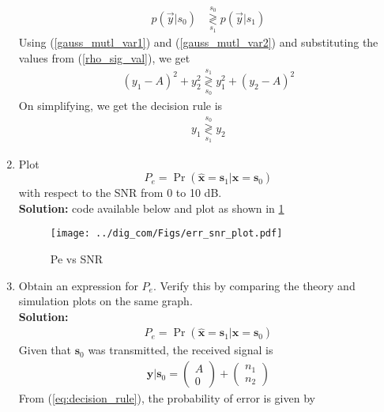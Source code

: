 \documentclass{article}
\numberwithin{equation}{subsection}
\numberwithin{figure}{subsection}
\providecommand{\mbf}{\mathbf}
\providecommand{\brak}[1]{\ensuremath{\left(#1\right)}}
\providecommand{\pr}[1]{\ensuremath{\Pr\left(#1\right)}}
\providecommand{\dec}[2]{\ensuremath{\overset{#1}{\underset{#2}{\gtrless}}}}
\newcommand{\solution}{\noindent \textbf{Solution: }}
\renewcommand\thesection{\arabic{section}}
\renewcommand\thesubsection{\thesection.\arabic{subsection}}
\begin{document}
\begin{enumerate}[label=\thesubsection.\arabic*,ref=\thesubsection.\arabic{figure}]
        \begin{align}
        \label{eq:map_bfsk_dec}
        p\brak{\vec{y}|s_0} &\dec{s_0}{s_1} p\brak{\vec{y}|s_1}
        \end{align}  
          Using (\ref{gauss_mutl_var1}) and (\ref{gauss_mutl_var2}) and substituting the values from (\ref{rho_sig_val}),  we get
        \begin{align}
        (y_1 -A)^2 + y_2^2 \dec{s_1}{s_0} y_1^2 + (y_2 - A)^2
        \end{align}
        On simplifying, we get the decision rule is
        \begin{align}
        \label{eq:decision_rule}
        y_1 \dec{s_0}{s_1} y_2
        \end{align}
\item
Plot 
\begin{equation} 
P_e = \pr{\hat{\mbf{x}} = \mbf{s}_1|\mbf{x} = \mbf{s}_0}
\end{equation}
with respect to the SNR from 0 to 10 dB.\\
\solution 
code available below and plot as shown in \ref{fig:Pe_snr2}
\begin{center}
\end{center}
\begin{figure}
\centering
\texttt{[image: ../dig\_com/Figs/err\_snr\_plot.pdf]}       
\caption{Pe vs SNR }
\label{fig:Pe_snr2}
\end{figure}
\item
Obtain an expression for $P_e$. Verify this by comparing the theory and simulation plots on the same graph.\\
\solution 
    \begin{align}
    P_e = \pr{\hat{\mbf{x}} = \mbf{s}_1|\mbf{x} = \mbf{s}_0}
    \end{align}
    Given that $\mbf{s}_0$ was transmitted, the received signal is
    \begin{align}
    \mbf{y}|\mbf{s}_0 = \begin{pmatrix} A \\ 0 \end{pmatrix} + \begin{pmatrix} n_1 \\ n_2 \end{pmatrix}
    \end{align}
    From (\ref{eq:decision_rule}), the probability of error is given by 

\end{enumerate}
\end{document}

